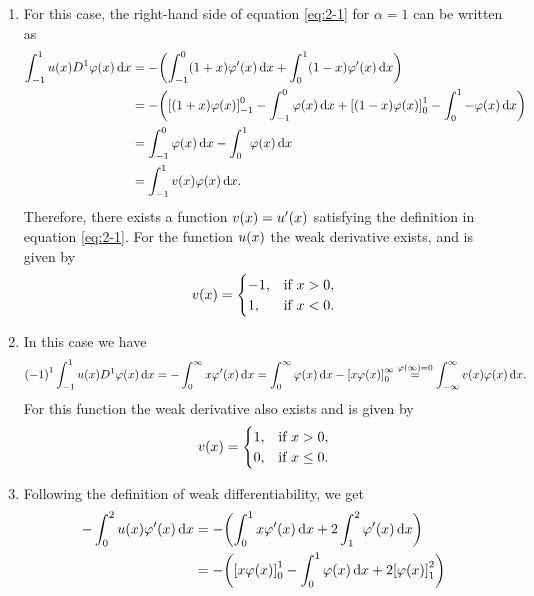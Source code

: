 \documentclass[english]{exercise}
\begin{document}
	\begin{enumerate}
		\item For this case, the right-hand side of equation \eqref{eq:2-1} for \(\alpha = 1\) can be written as
		\begin{align*}
			 \int_{-1}^1 u\parentheses*{x}D^1 \varphi\parentheses*{x}\d x &= -\parentheses*{\int_{-1}^0 \parentheses*{1 + x}\varphi'\parentheses*{x}\d x + \int_0^1 \parentheses*{1 - x}\varphi'\parentheses*{x}\d x}\\
			&= -\parentheses*{\brackets*{\parentheses*{1 + x}\varphi\parentheses*{x}}_{-1}^0 - \int_{-1}^0 \varphi\parentheses*{x}\d x + \brackets*{\parentheses*{1 - x}\varphi\parentheses*{x}}_0^1 - \int_0^1 -\varphi\parentheses*{x}\d x}\\
			&= \int_{-1}^0 \varphi\parentheses*{x}\d x - \int_0^1 \varphi\parentheses*{x}\d x\\
			&= \int_{-1}^1 v\parentheses*{x}\varphi\parentheses*{x}\d x.
		\end{align*}
		Therefore, there exists a function \(v\parentheses*{x} = u'\parentheses*{x}\) satisfying the definition in equation \eqref{eq:2-1}.
		For the function \(u\parentheses*{x}\) the weak derivative exists, and is given by
		\[
			v\parentheses*{x} = \begin{cases}
				-1, & \text{if }x > 0,\\
				1, & \text{if }x < 0.
			\end{cases}
		\]
		\item In this case we have
		\[
			\parentheses*{-1}^1 \int_{-1}^1 u\parentheses*{x}D^1 \varphi\parentheses*{x}\d x = -\int_0^\infty x\varphi'\parentheses*{x}\d x = \int_0^\infty \varphi\parentheses*{x}\d x - \brackets*{x\varphi\parentheses*{x}}_0^\infty \stackrel{\varphi\parentheses*{\infty} = 0}{=} \int_{-\infty}^\infty v\parentheses*{x}\varphi\parentheses*{x}\d x.
		\]
		For this function the weak derivative also exists and is given by
		\[
			v\parentheses*{x} = \begin{cases}
				1, & \text{if }x > 0,\\
				0, & \text{if }x \le 0.
			\end{cases}
		\]
		\item Following the definition of weak differentiability, we get
		\begin{align*}
			-\int_0^2 u\parentheses*{x}\varphi'\parentheses*{x}\d x &= -\parentheses*{\int_0^1 x\varphi'\parentheses*{x}\d x + 2\int_1^2 \varphi'\parentheses*{x}\d x}\\
			&= -\parentheses*{\brackets*{x\varphi\parentheses*{x}}_0^1 - \int_0^1 \varphi\parentheses*{x}\d x + 2\brackets*{\varphi\parentheses*{x}}_1^2}\\

\end{align*}
\end{enumerate}
\end{document}
